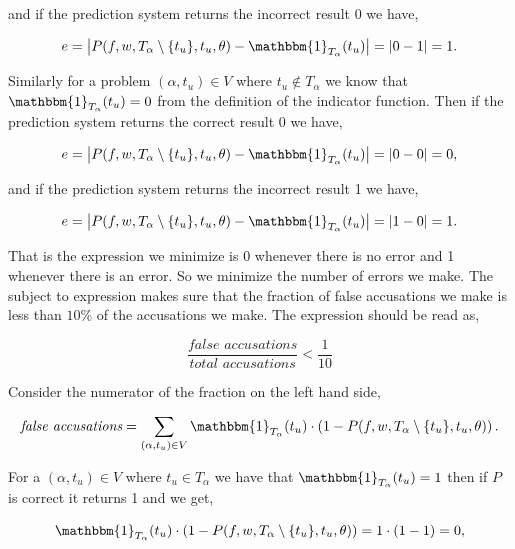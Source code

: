 and if the prediction system returns the incorrect result 0 we have,

\begin{equation}
    e = \left|
        P(f, w, T_\alpha \setminus \{t_u\}, t_u, \theta) -
        \mathbbm{1}_{T_\alpha}(t_u)
    \right| = |0 - 1| = 1.
\end{equation}

Similarly for a problem $(\alpha, t_u) \in V$ where $t_u \notin T_\alpha$ we
know that $\mathbbm{1}_{T_\alpha}(t_u) = 0$ from the definition of the indicator
function. Then if the prediction system returns the correct result 0 we have,

\begin{equation}
    e = \left|
        P(f, w, T_\alpha \setminus \{t_u\}, t_u, \theta) -
        \mathbbm{1}_{T_\alpha}(t_u)
    \right| = |0 - 0| = 0, \end{equation}

and if the prediction system returns the incorrect result 1 we have,

\begin{equation}
    e = \left|
        P(f, w, T_\alpha \setminus \{t_u\}, t_u, \theta) -
        \mathbbm{1}_{T_\alpha}(t_u)
    \right| = |1 - 0| = 1.
\end{equation}

That is the expression we minimize is 0 whenever there is no error and 1
whenever there is an error. So we minimize the number of errors we make. The
subject to expression makes sure that the fraction of false accusations we make
is less than $10\%$ of the accusations we make. The expression should be read
as,

$$ \frac{\textit{false accusations}}{\textit{total accusations}} <
\frac{1}{10} $$

Consider the numerator of the fraction on the left hand side,

\begin{equation}
    \textit{false accusations} = \sum_{(\alpha, t_u) \in V}
    \mathbbm{1}_{T_\alpha}(t_u) \cdot
    \left(1 - P(f, w, T_\alpha \setminus \{t_u\}, t_u, \theta)\right).
\end{equation}

For a $(\alpha, t_u) \in V$ where $t_u \in T_\alpha$ we have that
$\mathbbm{1}_{T_\alpha}(t_u) = 1$ then if $P$ is correct it returns 1 and we
get,

\begin{equation}
    \mathbbm{1}_{T_\alpha}(t_u) \cdot
    \left(1 - P(f, w, T_\alpha \setminus \{t_u\}, t_u, \theta)\right) =
    1 \cdot (1 - 1) = 0,
\end{equation}

